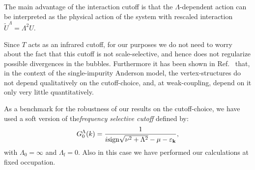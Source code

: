 The main advantage of the interaction cutoff is that  the $\Lambda$-dependent action can be interpreted\cite{Honerkamp2004} as the physical action of the system with rescaled interaction $\tilde{U}^\Lambda = \Lambda^2 U$.

Since $T$ acts as an infrared cutoff, for our purposes we do not need to worry about the fact that this cutoff is not scale-selective, and hence does not regularize possible divergences in the bubbles. 
Furthermore it has been shown in Ref.~ that, in the context of the single-impurity Anderson model, the vertex-structures do not depend qualitatively on the cutoff-choice, and, at weak-coupling, depend on it only very little quantitatively. 

As a benchmark for the robustness of our results on the cutoff-choice, we have used a soft version of the\textit{frequency selective cutoff} defined\cite{Eberlein2014} by:
\begin{equation}
G_0^\Lambda(k) = \frac{1}{i\mathrm{sign}\sqrt{\nu^2+\Lambda^2 }-\mu- \varepsilon_{\mathbf{k}}},  
\end{equation}  
with $\Lambda_0=\infty$ and $\Lambda_{\mathrm{f}}=0$. Also in this case we have performed our calculations at fixed occupation. 


   
